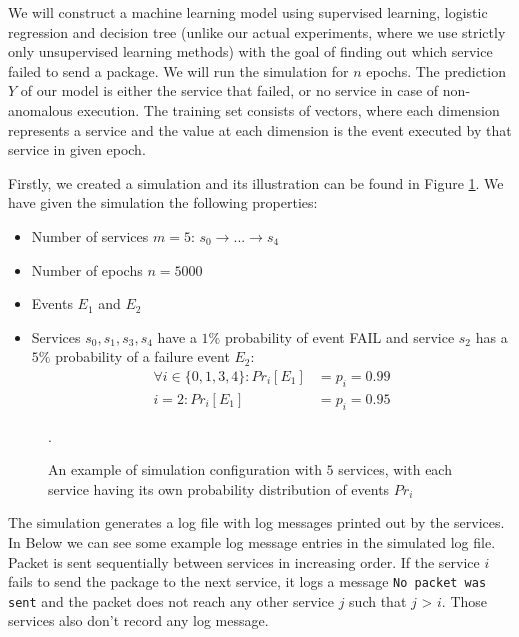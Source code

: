 We will construct a machine learning model using supervised learning, logistic regression and decision tree (unlike our actual experiments, where we use strictly only unsupervised learning methods) with the goal of finding out which service failed to send a package. We will run the simulation for $n$ epochs. The prediction $Y$ of our model is either the service that failed, or no service in case of non-anomalous execution. The training set consists of vectors, where each dimension represents a service and the value at each dimension is the event executed by that service in given epoch. 

Firstly, we created a simulation and its illustration can be found in Figure \ref{figure:simulation}. We have given the simulation the following properties: 

\begin{itemize}
    \item Number of services $m = 5$: $s_0 \rightarrow ... \rightarrow s_{4}$
    \item Number of epochs $n = 5000$
    \item Events $E_1$ and $E_2$
    \item Services $s_0, s_1, s_3, s_4$ have a $1\%$ probability of event FAIL and service $s_2$ has a $5\%$ probability of a failure event $E_2$:
    \begin{align*}
        \forall i \in \{0, 1, 3, 4\}: Pr_i[E_1] &= p_i = 0.99 \\
        i = 2: Pr_i[E_1] &= p_i = 0.95
    \end{align*}
\end{itemize}

\begin{figure}\centering
    
	\caption{An example of simulation configuration with $5$ services, with each service having its own probability distribution of events $Pr_i$}.
	\label{figure:simulation}
\end{figure}

The simulation generates a log file with log messages printed out by the services. In Below we can see some example log message entries in the simulated log file. Packet is sent sequentially between services in increasing order. If the service $i$ fails to send the package to the next service, it logs a message \texttt{No packet was sent} and the packet does not reach any other service $j$ such that $j$ > $i$. Those services also don't record any log message. 

